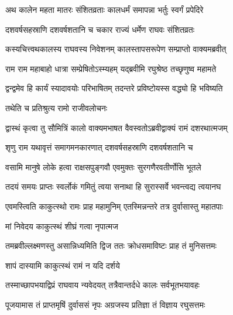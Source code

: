 \twolineshloka
{अथ कालेन महता मातरः संशितव्रताः}
{कालधर्मं समापन्ना भर्तुः स्वर्गं प्रपेदिरे}%

\twolineshloka
{दशवर्षसहस्राणि दशवर्षशतानि च}
{चकार राज्यं धर्मेण राघवः संशितव्रतः}%

\twolineshloka
{कस्यचित्त्वथकालस्य राघवस्य निवेशनम्}
{कालस्तापसरूपेण सम्प्राप्तो वाक्यमब्रवीत्}%


\twolineshloka
{राम राम महाबाहो धात्रा सम्प्रेषितोऽस्म्यहम्}
{यद्ब्रवीमि रघुश्रेष्ठ तच्छृणुष्व महामते}%

\twolineshloka
{द्वन्द्वमेव हि कार्यं स्यादावयोः परिभाषितम्}
{तदन्तरे प्रविष्टोयस्स वद्ध्यो हि भविष्यति}%


तथेति च प्रतिश्रुत्य रामो राजीवलोचनः

\twolineshloka
{द्वास्थं कृत्वा तु सौमित्रिं कालो वाक्यमभाषत}
{वैवस्वतोऽब्रवीद्वाक्यं रामं दशरथात्मजम्}%


\twolineshloka
{शृणु राम यथावृत्तं समागमनकारणात्}
{दशवर्षसहस्राणि दशवर्षशतानि च}%

\twolineshloka
{वसामि मानुषे लोके हत्वा राक्षसपुङ्गवौ}
{एवमुक्तः सुरगणैरवतीर्णोसि भूतले}%

\twolineshloka
{तदयं समयः प्राप्तः स्वर्लोकं गमितुं त्वया}
{सनाथा हि सुरास्सर्वे भवन्त्वद्य त्वयानघ}%


\twolineshloka
{एवमस्त्विति काकुत्स्थो रामः प्राह महामुनिम्}
{एतस्मिन्नन्तरे तत्र दुर्वासास्तु महातपाः}%


\onelineshloka
{मां निवेदय काकुत्स्थं शीघ्रं गत्वा नृपात्मज}%


\twolineshloka
{तमब्रवील्लक्ष्मणस्तु असान्निध्यमिति द्विज}
{ततः क्रोधसमाविष्टः प्राह तं मुनिसत्तमः}%


शापं दास्यामि काकुत्स्थं रामं न यदि दर्शये


\twolineshloka
{तस्माच्छापभयाद्विप्रं राघवाय न्यवेदयत्}
{तत्रैवान्तर्दधे कालः सर्वभूतभयावहः}%

\twolineshloka
{पूजयामास तं प्राप्तमृषिं दुर्वाससं नृपः}
{अग्रजस्य प्रतिज्ञा तं विज्ञाय रघुसत्तमः}%

